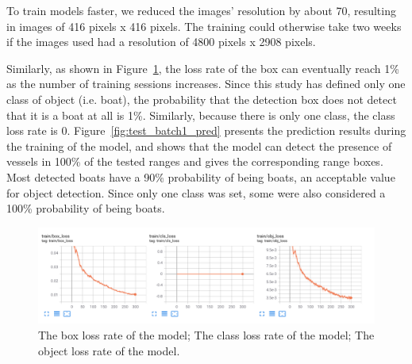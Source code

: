 To train models faster, we reduced the images' resolution by about 70, resulting in images of 416 pixels x 416 pixels. The training could otherwise take two weeks if the images used had a resolution of 4800 pixels x 2908 pixels.

Similarly, as shown in Figure~\ref{fig:colab_train}, the loss rate of the box can eventually reach 1\% as the number of training sessions increases. Since this study has defined only one class of object (i.e. boat), the probability that the detection box does not detect that it is a boat at all is 1\%. Similarly, because there is only one class, the class loss rate is 0. Figure~\ref{fig:test_batch1_pred} presents the prediction results during the training of the model, and shows that the model can detect the presence of vessels in 100\% of the tested ranges and gives the corresponding range boxes. Most detected boats have a 90\% probability of being boats, an acceptable value for object detection. Since only one class was set, some were also considered a 100\% probability of being boats.


\begin{figure}[!t]
    \centerline{\includegraphics[width=\columnwidth]{img/colab_train.png}}
    \caption{The box loss rate of the model; The class loss rate of the model; The object loss rate of the model.}
    \label{fig:colab_train}
\end{figure}

